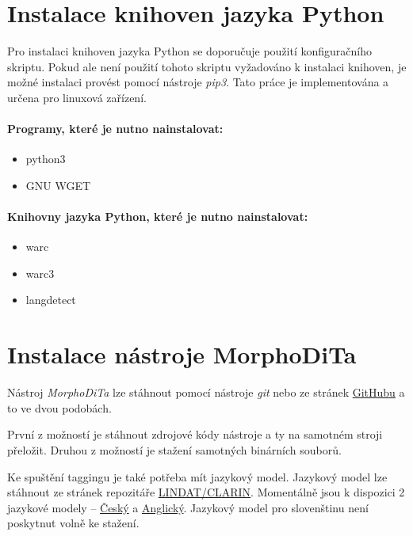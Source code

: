 \section{Instalace knihoven jazyka Python}
Pro instalaci knihoven jazyka Python se doporučuje použití konfiguračního skriptu. Pokud
ale není použití tohoto skriptu vyžadováno k instalaci knihoven, je možné instalaci provést pomocí nástroje
\textit{pip3}. Tato práce je implementována a určena pro linuxová zařízení.

\paragraph{Programy, které je nutno nainstalovat:}
\begin{itemize}
    \item python3
    \item GNU WGET
\end{itemize}

\paragraph{Knihovny jazyka Python, které je nutno nainstalovat:}
\begin{itemize}
    \item warc
    \item warc3
    \item langdetect
\end{itemize}

\section{Instalace nástroje MorphoDiTa}
Nástroj \textit{MorphoDiTa} lze stáhnout pomocí nástroje \textit{git} nebo
ze stránek \href{https://github.com/ufal/morphodita}{GitHubu} a to ve dvou podobách.

První z možností je stáhnout zdrojové kódy nástroje a ty na samotném stroji přeložit.
Druhou z možností je stažení samotných binárních souborů.

Ke spuštění taggingu je také potřeba mít jazykový model. Jazykový model lze stáhnout
ze stránek repozitáře \href{https://lindat.mff.cuni.cz/repository/xmlui/}{LINDAT/CLARIN}.
Momentálně jsou k dispozici 2 jazykové modely -- \href{https://lindat.mff.cuni.cz/repository/xmlui/handle/11234/1-1836}{Český}
a \href{https://lindat.mff.cuni.cz/repository/xmlui/}{Anglický}. Jazykový model pro slovenštinu
není poskytnut volně ke stažení.

